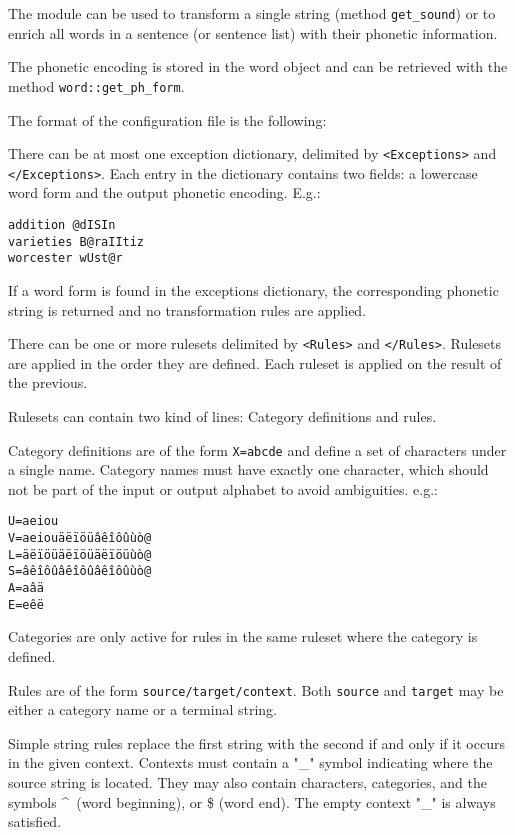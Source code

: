 \documentclass[a4paper]{book}
\begin{document}
 The module can be used to transform a single string (method
 \verb#get_sound#) or to enrich all words in a sentence (or sentence
 list) with their phonetic information.

 The phonetic encoding is stored in the word object and can be retrieved
 with the method \verb#word::get_ph_form#.

 The format of the configuration file is the following:

 There can be at most one exception dictionary, delimited by
 \verb#<Exceptions># and \verb#</Exceptions>#.  Each entry in the
 dictionary contains two fields: a lowercase word form and the output
 phonetic encoding. E.g.:
\begin{verbatim}
addition @dISIn
varieties B@raIItiz
worcester wUst@r
\end{verbatim}

  If a word form is found in the exceptions dictionary, the corresponding
phonetic string is returned and no transformation rules are applied.

 There can be one or more rulesets delimited by \verb#<Rules># and
 \verb#</Rules>#.  Rulesets are applied in the order they are
 defined. Each ruleset is applied on the result of the previous.
 
 Rulesets can contain two kind of lines:  Category definitions and rules.

 Category definitions are of the form \verb#X=abcde# and define a set of
 characters under a single name. Category names must have exactly one character,
 which should not be part of the input or output alphabet to avoid ambiguities. 
 e.g.: 
\begin{verbatim}
U=aeiou
V=aeiouäëïöüâêîôûùò@
L=äëïöüäëïöüäëïöüùò@
S=âêîôûâêîôûâêîôûùò@
A=aâä
E=eêë
\end{verbatim}

 Categories are only active for rules in the same ruleset where the category is defined.

 Rules are of the form \verb#source/target/context#. Both
 \verb#source# and \verb#target# may be either a category name or a
 terminal string. 

 Simple string rules replace the first string with the second if and
 only if it occurs in the given context. Contexts must contain a "\_"
 symbol indicating where the source string is located. They may also
 contain characters, categories, and the symbols \^~(word beginning),
 or \$ (word end). The empty context "\_" is always satisfied.
\end{document}
